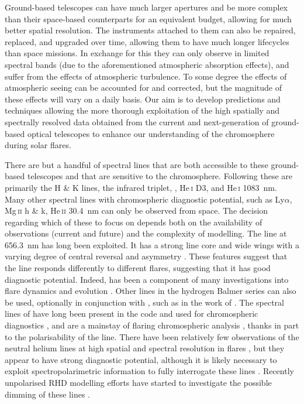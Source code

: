 Ground-based telescopes can have much larger apertures and be more complex than their space-based counterparts for an equivalent budget, allowing for much better spatial resolution.
The instruments attached to them can also be repaired, replaced, and upgraded over time, allowing them to have much longer lifecycles than space missions.
In exchange for this they can only observe in limited spectral bands (due to the aforementioned atmospheric absorption effects), and suffer from the effects of atmospheric turbulence.
To some degree the effects of atmospheric seeing can be accounted for and corrected, but the magnitude of these effects will vary on a daily basis.
Our aim is to develop predictions and techniques allowing the more thorough exploitation of the high spatially and spectrally resolved data obtained from the current and next-generation of ground-based optical telescopes to enhance our understanding of the chromosphere during solar flares.

There are but a handful of spectral lines that are both accessible to these ground-based telescopes and that are sensitive to the chromosphere.
Following \citet{DelaCruzRodriguez2017} these are primarily the \Caii{} H \& K lines, the \Caii{} infrared triplet, \Ha{}, He\,\textsc{i} D3, and He\,\textsc{i} \SI{1083}{\nano\metre}.
Many other spectral lines with chromospheric diagnostic potential, such as Ly$\alpha$, Mg\,\textsc{ii} h \& k, He\,\textsc{ii} \SI{30.4}{\nano\metre} can only be observed from space.
The decision regarding which of these to focus on depends both on the availability of observations (current and future) and the complexity of modelling.
The \Ha{} line at \SI{656.3}{\nano\m} has long been exploited.
It has a strong line core and wide wings with a varying degree of central reversal and asymmetry \citep[e.g.][]{Svestka1966}.
These features suggest that the line responds differently to different flares, suggesting that it has good diagnostic potential.
Indeed, \Ha{} has been a component of many investigations into flare dynamics and evolution \citep[e.g.][]{Acton1982,Heinzel1994,Wang1995,Kuridze2015,RubioDaCosta2016}.
Other lines in the hydrogen Balmer series can also be used, optionally in conjunction with \Ha{}, such as in the work of \citet{Capparelli2017}.
The spectral lines of \Caii{} have long been present in the \Radyn{} code and used for chromospheric diagnostics \citep[e.g.][]{Carlsson1992a}, and are a mainstay of flaring chromospheric analysis \citep[e.g.][]{1997Mein,Cauzzi2008,Kuridze2015,RubioDaCosta2016,Kuridze2018,Vissers2021,Yadav2021}, thanks in part to the polarisability of the \CaLine{} line.
There have been relatively few observations of the neutral helium lines at high spatial and spectral resolution in flares \citep[e.g.][]{Zeng2014, Libbrecht2019}, but they appear to have strong diagnostic potential, although it is likely necessary to exploit spectropolarimetric information to fully interrogate these lines \citep{Libbrecht2019}.
Recently unpolarised RHD modelling efforts have started to investigate the possible dimming of these lines \citep{Kerr2021}.

